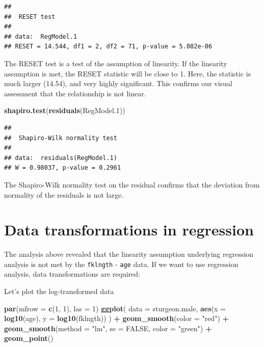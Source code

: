 \documentclass[
  12pt,
]{book}
\newenvironment{Shaded}{\begin{snugshade}}{\end{snugshade}}
\newcommand{\DataTypeTok}[1]{\textcolor[rgb]{0.13,0.29,0.53}{#1}}
\newcommand{\DecValTok}[1]{\textcolor[rgb]{0.00,0.00,0.81}{#1}}
\newcommand{\FloatTok}[1]{\textcolor[rgb]{0.00,0.00,0.81}{#1}}
\newcommand{\KeywordTok}[1]{\textcolor[rgb]{0.13,0.29,0.53}{\textbf{#1}}}
\newcommand{\NormalTok}[1]{#1}
\newcommand{\OperatorTok}[1]{\textcolor[rgb]{0.81,0.36,0.00}{\textbf{#1}}}
\newcommand{\OtherTok}[1]{\textcolor[rgb]{0.56,0.35,0.01}{#1}}
\newcommand{\StringTok}[1]{\textcolor[rgb]{0.31,0.60,0.02}{#1}}
\begin{document}
\begin{verbatim}
## 
##  RESET test
## 
## data:  RegModel.1
## RESET = 14.544, df1 = 2, df2 = 71, p-value = 5.082e-06
\end{verbatim}

The RESET test is a test of the assumption of linearity. If the linearity assumption is met, the RESET statistic will be close to 1. Here, the statistic is much larger (14.54), and very highly significant. This confirms our visual assessment that the relationship is not linear.

\begin{Shaded}
\begin{Highlighting}[]
\KeywordTok{shapiro.test}\NormalTok{(}\KeywordTok{residuals}\NormalTok{(RegModel}\FloatTok{.1}\NormalTok{))}
\end{Highlighting}
\end{Shaded}

\begin{verbatim}
## 
##  Shapiro-Wilk normality test
## 
## data:  residuals(RegModel.1)
## W = 0.98037, p-value = 0.2961
\end{verbatim}

The Shapiro-Wilk normality test on the residual confirms that
the deviation from normality of the residuals is not large.

\hypertarget{data-transformations-in-regression}{%
\section{Data transformations in regression}\label{data-transformations-in-regression}}

The analysis above revealed that the linearity assumption underlying regression analysis is not met by the \texttt{fklngth} - \texttt{age} data. If we want to use regression analysis, data transformations are required:

Let's plot the log-transformed data

\begin{Shaded}
\begin{Highlighting}[]
\KeywordTok{par}\NormalTok{(}\DataTypeTok{mfrow =} \KeywordTok{c}\NormalTok{(}\DecValTok{1}\NormalTok{, }\DecValTok{1}\NormalTok{), }\DataTypeTok{las =} \DecValTok{1}\NormalTok{)}
\KeywordTok{ggplot}\NormalTok{(}
  \DataTypeTok{data =}\NormalTok{ sturgeon.male,}
  \KeywordTok{aes}\NormalTok{(}\DataTypeTok{x =} \KeywordTok{log10}\NormalTok{(age), }\DataTypeTok{y =} \KeywordTok{log10}\NormalTok{(fklngth))}
\NormalTok{) }\OperatorTok{+}
\StringTok{  }\KeywordTok{geom\_smooth}\NormalTok{(}\DataTypeTok{color =} \StringTok{"red"}\NormalTok{) }\OperatorTok{+}
\StringTok{  }\KeywordTok{geom\_smooth}\NormalTok{(}\DataTypeTok{method =} \StringTok{"lm"}\NormalTok{, }\DataTypeTok{se =} \OtherTok{FALSE}\NormalTok{, }\DataTypeTok{color =} \StringTok{"green"}\NormalTok{) }\OperatorTok{+}
\StringTok{  }\KeywordTok{geom\_point}\NormalTok{()}
\end{Highlighting}
\end{Shaded}
\end{document}
